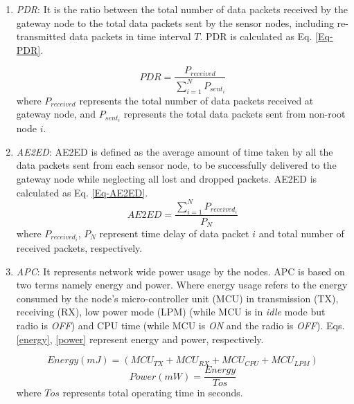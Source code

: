 \documentclass[]{svjour3}                     %
\begin{document}
\begin{enumerate}
	\item \textit{PDR}: It is the ratio between the total number of data packets received by the gateway node to the total data packets sent by the sensor nodes, including re-transmitted data packets in time interval $ T $. PDR is calculated as Eq. \ref{Eq-PDR}.
	
	\begin{equation}
		PDR = \frac{P_{received}}{\sum_{i=1}^{N} P_{sent_i}}
		\label{Eq-PDR}
	\end{equation} 
	where $ P_{received} $ represents the total number of data packets received at gateway node, and $ P_{sent_i} $ represents the total data packets sent from non-root node $ i $.
	
	\item \textit{AE2ED}: AE2ED is defined as the average amount of time taken by all the data packets sent from each sensor node, to be successfully delivered to the gateway node while neglecting all lost and dropped packets. AE2ED is calculated as Eq. \ref{Eq-AE2ED}.
	\begin{equation}
		AE2ED = \frac{\sum_{i=1}^{N} P_{received_i}}{P_{N}}
		\label{Eq-AE2ED} 
	\end{equation}
	where $ P_{received_{i}} $, $ P_{N} $ represent time delay of data packet $ i $ and total number of received packets, respectively. 
	\item \textit{APC}: It represents network wide power usage by the nodes. APC is based on two terms namely energy and power. Where energy usage refers to the energy consumed by the node's micro-controller unit (MCU) in transmission (TX), receiving (RX), low  power mode (LPM) (while MCU is in \textit{idle} mode but radio is \textit{OFF}) and CPU time (while MCU is \textit{ON} and the radio is \textit{OFF}). Eqs. \ref{energy}, \ref{power} represent energy and power, respectively.  
	
	\begin{equation}
		Energy(mJ) =
		(MCU_{TX} + MCU_{RX} + MCU_{CPU} + MCU_{LPM})
		\label{energy}
	\end{equation}
	\begin{equation}
		Power(mW) = \frac{Energy}{Tos}
		\label{power}
	\end{equation}
	where $ Tos $ represents total operating time in seconds.
\end{enumerate} 
\end{document}
